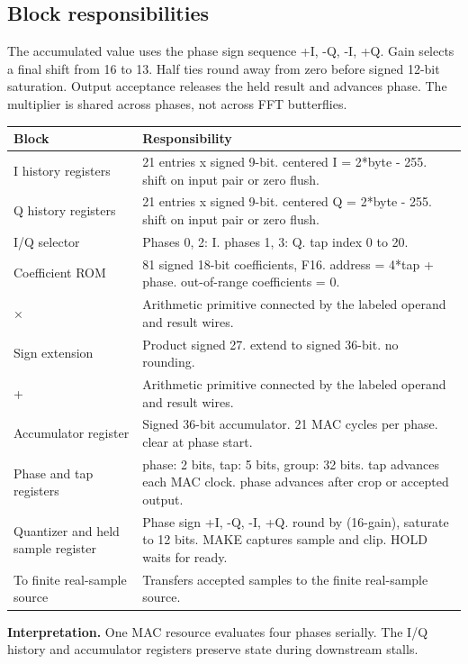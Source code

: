 \documentclass[11pt,letterpaper]{article}
\begin{document}
\subsection*{Block responsibilities}
The accumulated value uses the phase sign sequence +I, -Q, -I, +Q. Gain selects a final shift from 16 to 13. Half ties round away from zero before signed 12-bit saturation. Output acceptance releases the held result and advances phase. The multiplier is shared across phases, not across FFT butterflies.
\par\medskip\noindent
\begin{tabularx}{\linewidth}{@{}>{\raggedright\arraybackslash}p{1.65in}Y@{}}\toprule
\textbf{Block} & \textbf{Responsibility} \\ \midrule
I history registers & 21 entries x signed 9-bit. centered I = 2*byte - 255. shift on input pair or zero flush. \\[5pt]
Q history registers & 21 entries x signed 9-bit. centered Q = 2*byte - 255. shift on input pair or zero flush. \\[5pt]
I/Q selector & Phases 0, 2: I. phases 1, 3: Q. tap index 0 to 20. \\[5pt]
Coefficient ROM & 81 signed 18-bit coefficients, F16. address = 4*tap + phase. out-of-range coefficients = 0. \\[5pt]
× & Arithmetic primitive connected by the labeled operand and result wires. \\[5pt]
Sign extension & Product signed 27. extend to signed 36-bit. no rounding. \\[5pt]
+ & Arithmetic primitive connected by the labeled operand and result wires. \\[5pt]
Accumulator register & Signed 36-bit accumulator. 21 MAC cycles per phase. clear at phase start. \\[5pt]
Phase and tap registers & phase: 2 bits, tap: 5 bits, group: 32 bits. tap advances each MAC clock. phase advances after crop or accepted output. \\[5pt]
Quantizer and held sample register & Phase sign +I, -Q, -I, +Q. round by (16-gain), saturate to 12 bits. MAKE captures sample and clip. HOLD waits for ready. \\[5pt]
To finite real-sample source & Transfers accepted samples to the finite real-sample source. \\[5pt]
\bottomrule\end{tabularx}
\vspace{8pt}
\noindent\textbf{Interpretation.} One MAC resource evaluates four phases serially. The I/Q history and accumulator registers preserve state during downstream stalls.
\clearpage
\end{document}
